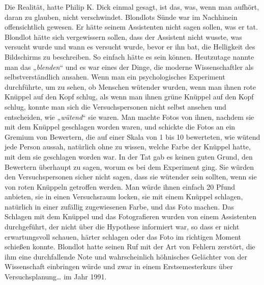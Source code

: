 {Die Realität, hatte Philip K. Dick einmal gesagt, ist das, was, wenn man aufhört, daran zu glauben, nicht verschwindet. Blondlots Sünde war im Nachhinein offensichtlich gewesen. Er hätte seinem Assistenten nicht sagen sollen, was er tat. Blondlot hätte sich vergewissern sollen, dass der Assistent nicht wusste, was versucht wurde und wann es versucht wurde, bevor er ihn bat, die Helligkeit des Bildschirms zu beschreiben. So einfach hätte es sein können. Heutzutage nannte man das „\emph{blenden}“ und es war eines der Dinge, die moderne Wissenschaftler als selbstverständlich ansahen. Wenn man ein psychologisches Experiment durchführte, um zu sehen, ob Menschen wütender wurden, wenn man ihnen rote Knüppel auf den Kopf schlug, als wenn man ihnen grüne Knüppel auf den Kopf schlug, konnte man sich die Versuchspersonen nicht selbst ansehen und entscheiden, wie „\emph{wütend}“ sie waren. Man machte Fotos von ihnen, nachdem sie mit dem Knüppel geschlagen worden waren, und schickte die Fotos an ein Gremium von Bewertern, die auf einer Skala von 1 bis 10 bewerteten, wie wütend jede Person aussah, natürlich ohne zu wissen, welche Farbe der Knüppel hatte, mit dem sie geschlagen worden war. In der Tat gab es keinen guten Grund, den Bewertern überhaupt zu sagen, worum es bei dem Experiment ging. Sie würden den Versuchspersonen sicher nicht sagen, dass sie wütender sein sollten, wenn sie von roten Knüppeln getroffen werden. Man würde ihnen einfach 20 Pfund anbieten, sie in einen Versuchsraum locken, sie mit einem Knüppel schlagen, natürlich in einer zufällig zugewiesenen Farbe, und das Foto machen. Das Schlagen mit dem Knüppel und das Fotografieren wurden von einem Assistenten durchgeführt, der nicht über die Hypothese informiert war, so dass er nicht erwartungsvoll schauen, härter schlagen oder das Foto im richtigen Moment schießen konnte. Blondlot hatte seinen Ruf mit der Art von Fehlern zerstört, die ihm eine durchfallende Note und wahrscheinlich höhnisches Gelächter von der Wissenschaft einbringen würde und zwar in einem Erstsemesterkurs über Versuchsplanung… im Jahr 1991.

}
